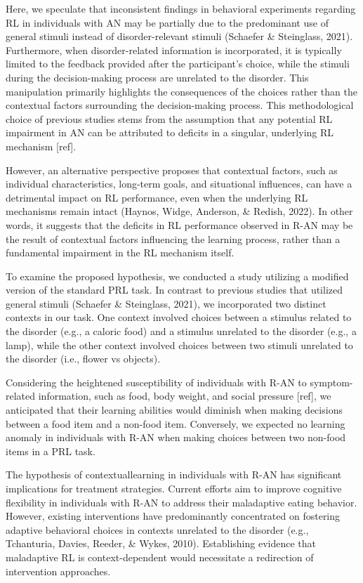 \documentclass[
  man,floatsintext]{apa6}
\begin{document}
Here, we speculate that inconsistent findings in behavioral experiments regarding RL in individuals with AN may be partially due to the predominant use of general stimuli instead of disorder-relevant stimuli (Schaefer \& Steinglass, 2021). Furthermore, when disorder-related information is incorporated, it is typically limited to the feedback provided after the participant's choice, while the stimuli during the decision-making process are unrelated to the disorder. This manipulation primarily highlights the consequences of the choices rather than the contextual factors surrounding the decision-making process. This methodological choice of previous studies stems from the assumption that any potential RL impairment in AN can be attributed to deficits in a singular, underlying RL mechanism {[}ref{]}.

However, an alternative perspective proposes that contextual factors, such as individual characteristics, long-term goals, and situational influences, can have a detrimental impact on RL performance, even when the underlying RL mechanisms remain intact (Haynos, Widge, Anderson, \& Redish, 2022). In other words, it suggests that the deficits in RL performance observed in R-AN may be the result of contextual factors influencing the learning process, rather than a fundamental impairment in the RL mechanism itself.

To examine the proposed hypothesis, we conducted a study utilizing a modified version of the standard PRL task. In contrast to previous studies that utilized general stimuli (Schaefer \& Steinglass, 2021), we incorporated two distinct contexts in our task. One context involved choices between a stimulus related to the disorder (e.g., a caloric food) and a stimulus unrelated to the disorder (e.g., a lamp), while the other context involved choices between two stimuli unrelated to the disorder (i.e., flower vs objects).

Considering the heightened susceptibility of individuals with R-AN to symptom-related information, such as food, body weight, and social pressure {[}ref{]}, we anticipated that their learning abilities would diminish when making decisions between a food item and a non-food item. Conversely, we expected no learning anomaly in individuals with R-AN when making choices between two non-food items in a PRL task.

The hypothesis of contextuallearning in individuals with R-AN has significant implications for treatment strategies. Current efforts aim to improve cognitive flexibility in individuals with R-AN to address their maladaptive eating behavior. However, existing interventions have predominantly concentrated on fostering adaptive behavioral choices in contexts unrelated to the disorder (e.g., Tchanturia, Davies, Reeder, \& Wykes, 2010). Establishing evidence that maladaptive RL is context-dependent would necessitate a redirection of intervention approaches.
\end{document}
